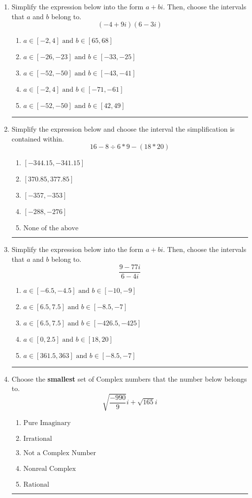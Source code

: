 \documentclass[14pt]{extbook}
\newcommand{\litem}[1]{\item#1\hspace*{-1cm}\rule{\textwidth}{0.4pt}}
\begin{document}
\begin{enumerate}
{\begin{enumerate}[label=\Alph*.]
\end{enumerate} }
\litem{
Simplify the expression below into the form $a+bi$. Then, choose the intervals that $a$ and $b$ belong to.\[ (-4 + 9 i)(6 - 3 i) \]\begin{enumerate}[label=\Alph*.]
\item \( a \in [-2, 4] \text{ and } b \in [65, 68] \)
\item \( a \in [-26, -23] \text{ and } b \in [-33, -25] \)
\item \( a \in [-52, -50] \text{ and } b \in [-43, -41] \)
\item \( a \in [-2, 4] \text{ and } b \in [-71, -61] \)
\item \( a \in [-52, -50] \text{ and } b \in [42, 49] \)

\end{enumerate} }
\litem{
Simplify the expression below and choose the interval the simplification is contained within.\[ 16 - 8 \div 6 * 9 - (18 * 20) \]\begin{enumerate}[label=\Alph*.]
\item \( [-344.15, -341.15] \)
\item \( [370.85, 377.85] \)
\item \( [-357, -353] \)
\item \( [-288, -276] \)
\item \( \text{None of the above} \)

\end{enumerate} }
\litem{
Simplify the expression below into the form $a+bi$. Then, choose the intervals that $a$ and $b$ belong to.\[ \frac{9 - 77 i}{6 - 4 i} \]\begin{enumerate}[label=\Alph*.]
\item \( a \in [-6.5, -4.5] \text{ and } b \in [-10, -9] \)
\item \( a \in [6.5, 7.5] \text{ and } b \in [-8.5, -7] \)
\item \( a \in [6.5, 7.5] \text{ and } b \in [-426.5, -425] \)
\item \( a \in [0, 2.5] \text{ and } b \in [18, 20] \)
\item \( a \in [361.5, 363] \text{ and } b \in [-8.5, -7] \)

\end{enumerate} }
\litem{
Choose the \textbf{smallest} set of Complex numbers that the number below belongs to.\[ \sqrt{\frac{-990}{9}} i+\sqrt{165}i \]\begin{enumerate}[label=\Alph*.]
\item \( \text{Pure Imaginary} \)
\item \( \text{Irrational} \)
\item \( \text{Not a Complex Number} \)
\item \( \text{Nonreal Complex} \)
\item \( \text{Rational} \)


\end{enumerate}}
\end{enumerate}
\end{document}
